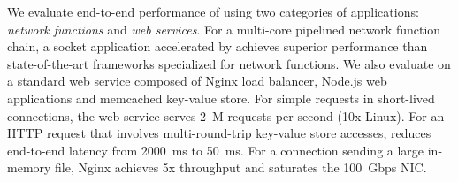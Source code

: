 We evaluate end-to-end performance of \sys{} using two categories of applications: \textit{network functions} and \textit{web services}. For a multi-core pipelined network function chain, a socket application accelerated by \sys{} achieves superior performance than state-of-the-art frameworks specialized for network functions. We also evaluate \sys{} on a standard web service composed of Nginx load balancer, Node.js web applications and memcached key-value store. For simple requests in short-lived connections, the web service serves 2~M requests per second (10x Linux). For an HTTP request that involves multi-round-trip key-value store accesses, \sys{} reduces end-to-end latency from 2000~ms to 50~ms. For a connection sending a large in-memory file, Nginx achieves 5x throughput and saturates the 100~Gbps NIC.
